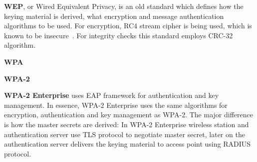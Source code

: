 \textbf{WEP}, or Wired Equivalent Privacy, is an old standard which defines how 
the keying material is derived, what encryption and message authentication algorithms to 
be used. For encryption, RC4 stream cipher is being used, which is known to be 
insecure~\cite{}. For integrity checks this standard employs CRC-32 algorithm.

\textbf{WPA}

\textbf{WPA-2}

\textbf{WPA-2 Enterprise} uses EAP framework for authentication and key management. In essence,
WPA-2 Enterprise uses the same algorithms for encryption, authentication and key management as 
WPA-2. The major difference is how the master secrets are derived: In WPA-2 Enterprise wireless 
station and authentication server use TLS protocol to negotiate master secret, later on the
authentication server delivers the keying material to access point using RADIUS protocol.



